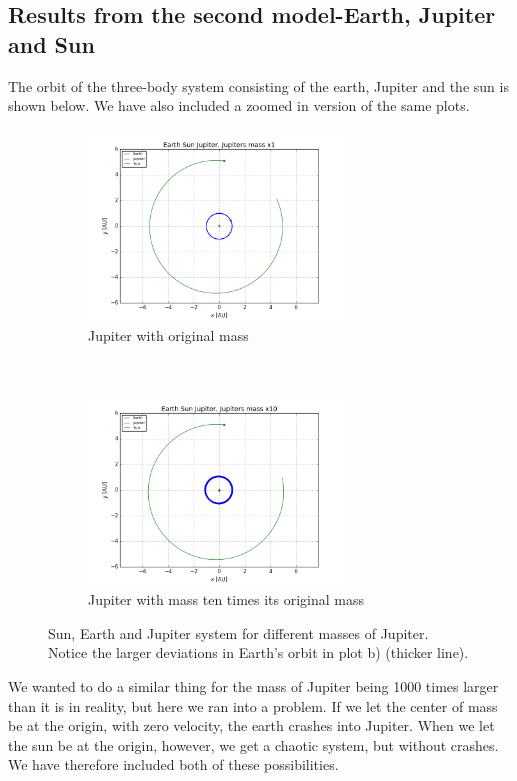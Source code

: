 \documentclass[a4paper, 10pt]{article}
\begin{document}
\subsection{Results from the second model-Earth, Jupiter and Sun}
The orbit of the three-body system consisting of the earth, Jupiter and the sun is shown below. We have also included a zoomed in version of the same plots.\\
\begin{figure}[!ht]
    \centering
    \begin{subfigure}[H!]{0.5\textwidth}
        \centering
        \includegraphics[height=2.0in]{orbitESJ1.png}
        \caption{Jupiter with original mass}
    \end{subfigure}%
    ~ 
    \begin{subfigure}[H!]{0.5\textwidth}
        \centering
        \includegraphics[height=2.0in]{orbitESJ10.png}
        \caption{Jupiter with mass ten times its original mass}
    \end{subfigure}
    \caption{Sun, Earth and Jupiter system for different masses of Jupiter. Notice the larger deviations in Earth's orbit in plot b) (thicker line).} \label{fig:jupiter1-10}
\end{figure}
\linebreak
We wanted to do a similar thing for the mass of Jupiter being 1000 times larger than it is in reality, but here we ran into a problem. If we let the center of mass be at the origin, with zero velocity, the earth crashes into Jupiter. When we let the sun be at the origin, however, we get a chaotic system, but without crashes. We have therefore included both of these possibilities.
\end{document}
